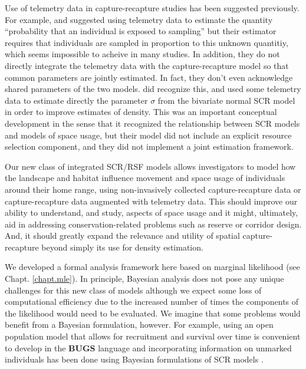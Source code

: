 Use of telemetry data in capture-recapture studies has been suggested
previously. For example, \citet{white_shenk:2001} and
\citet{ivan:2012} suggested using telemetry data to estimate the
quantity ``probability that an individual is exposed to sampling'' but
their estimator requires that individuals are sampled in proportion to
this unknown quantitiy, which seems impossible to acheive in many
studies. In addition, they do not directly integrate the telemetry
data with the capture-recapture model so that common parameters are
jointly estimated. In fact, they don't even acknowledge shared
parameters of the two models.  \citet{sollmann_etal:inprep} did
recognize this, and used some telemetry data to estimate directly the
parameter $\sigma$ from the bivariate normal SCR model in order to
improve estimates of density. This was an important conceptual
development in the sense that it recognized the relationship between
SCR models and models of space usage, but their model did not include
an explicit resource selection component, and they did not implement a
joint estimation framework.

Our new class of integrated SCR/RSF models allows investigators to model how the landscape and
habitat influence movement and space usage of individuals around their
home range, using non-invasively collected capture-recapture data or
capture-recapture data augmented with telemetry data.  This should
improve our ability to understand, and study, aspects of space usage
and it might, ultimately, aid in addressing conservation-related
problems such as reserve or corridor design. And, it should greatly
expand the relevance and utility of spatial capture-recapture beyond
simply its use for density estimation.


We developed a formal analysis framework here based on marginal
likelihood \citep{borchers_efford:2008} (see Chapt. \ref{chapt.mle}).
In principle, Bayesian analysis does not pose any unique challenges
for this new class of models although we expect some loss of
computational efficiency due to the increased number of times the
components of the likelihood would need to be evaluated.  We imagine
that some problems would benefit from a Bayesian formulation,
however. For example, using an open population model that allows for
recruitment and survival over time \citep{gardner_etal:2010ecol} is
convenient to develop in the {\bf BUGS} language and incorporating
information on unmarked individuals has been done using Bayesian
formulations of SCR models \citep{chandler_royle:2012,
  sollmann_etal:2012}.

